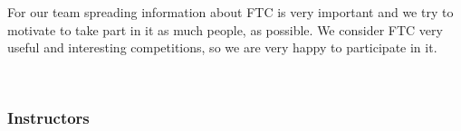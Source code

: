 	For our team spreading information about FTC is very important and we try to motivate to take part in it as much people, as possible. We consider FTC very useful and interesting competitions, so we are very happy to participate in it. 
	\begin{figure}[H]
		\\
	\end{figure}
\fillpage

\subsubsection{Instructors}

